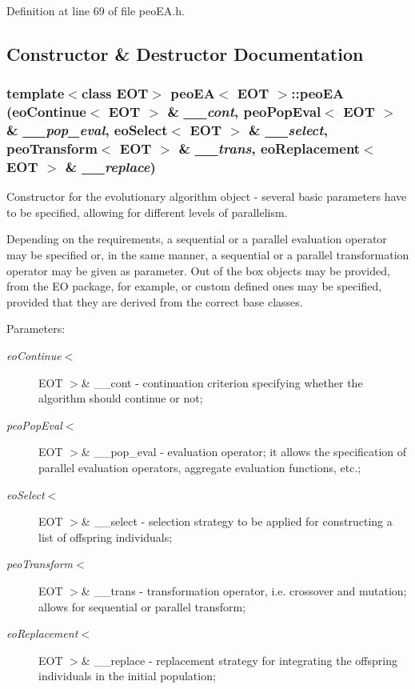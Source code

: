 Definition at line 69 of file peo\-EA.h.

\subsection{Constructor \& Destructor Documentation}
\subsubsection{\setlength{\rightskip}{0pt plus 5cm}template$<$class EOT$>$ {\bf peo\-EA}$<$ EOT $>$::{\bf peo\-EA} (eo\-Continue$<$ EOT $>$ \& {\em \_\-\_\-cont}, {\bf peo\-Pop\-Eval}$<$ EOT $>$ \& {\em \_\-\_\-pop\_\-eval}, eo\-Select$<$ EOT $>$ \& {\em \_\-\_\-select}, {\bf peo\-Transform}$<$ EOT $>$ \& {\em \_\-\_\-trans}, eo\-Replacement$<$ EOT $>$ \& {\em \_\-\_\-replace})}\label{classpeo_e_a_dbfc4f8907bef234602149229f132371}


Constructor for the evolutionary algorithm object - several basic parameters have to be specified, allowing for different levels of parallelism. 

Depending on the requirements, a sequential or a parallel evaluation operator may be specified or, in the same manner, a sequential or a parallel transformation operator may be given as parameter. Out of the box objects may be provided, from the EO package, for example, or custom defined ones may be specified, provided that they are derived from the correct base classes.

\begin{Desc}
\item[Parameters:]
\begin{description}
\item[{\em eo\-Continue$<$}]EOT $>$\& \_\-\_\-cont - continuation criterion specifying whether the algorithm should continue or not; \item[{\em peo\-Pop\-Eval$<$}]EOT $>$\& \_\-\_\-pop\_\-eval - evaluation operator; it allows the specification of parallel evaluation operators, aggregate evaluation functions, etc.; \item[{\em eo\-Select$<$}]EOT $>$\& \_\-\_\-select - selection strategy to be applied for constructing a list of offspring individuals; \item[{\em peo\-Transform$<$}]EOT $>$\& \_\-\_\-trans - transformation operator, i.e. crossover and mutation; allows for sequential or parallel transform; \item[{\em eo\-Replacement$<$}]EOT $>$\& \_\-\_\-replace - replacement strategy for integrating the offspring individuals in the initial population; \end{description}
\end{Desc}


